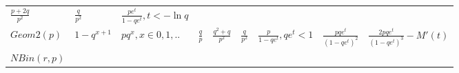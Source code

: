 \documentclass[]{tufte-book}
\begin{document}
\begin{longtable}[]{@{}lllllllll@{}}
\begin{minipage}[t]{0.08\columnwidth}
\(\frac{p+2q}{p^2}\)\strut
\end{minipage} & \begin{minipage}[t]{0.08\columnwidth}\raggedright
\(\frac{q}{p^2}\)\strut
\end{minipage} & \begin{minipage}[t]{0.08\columnwidth}\raggedright
\(\frac{pe^t}{1-qe^t},t<-\ln{q}\)\strut
\end{minipage} & \begin{minipage}[t]{0.08\columnwidth}\raggedright
\strut
\end{minipage} & \begin{minipage}[t]{0.08\columnwidth}\raggedright
\strut
\end{minipage}\tabularnewline
\begin{minipage}[t]{0.08\columnwidth}\raggedright
\(Geom2(p)\)\strut
\end{minipage} & \begin{minipage}[t]{0.08\columnwidth}\raggedright
\(1-q^{x+1}\)\strut
\end{minipage} & \begin{minipage}[t]{0.08\columnwidth}\raggedright
\(pq^x,x\in 0,1,..\)\strut
\end{minipage} & \begin{minipage}[t]{0.08\columnwidth}\raggedright
\(\frac{q}p\)\strut
\end{minipage} & \begin{minipage}[t]{0.08\columnwidth}\raggedright
\(\frac{q^2+q}{p^2}\)\strut
\end{minipage} & \begin{minipage}[t]{0.08\columnwidth}\raggedright
\(\frac{q}{p^2}\)\strut
\end{minipage} & \begin{minipage}[t]{0.08\columnwidth}\raggedright
\(\frac{p}{1-qe^t}, qe^t<1\)\strut
\end{minipage} & \begin{minipage}[t]{0.08\columnwidth}\raggedright
\(\frac{pqe^t}{(1-qe^t)^2}\)\strut
\end{minipage} & \begin{minipage}[t]{0.08\columnwidth}\raggedright
\(\frac{2pqe^t}{(1-qe^t)^3}-M'(t)\)\strut
\end{minipage}\tabularnewline
\begin{minipage}[t]{0.08\columnwidth}\raggedright
\(NBin(r,p)\)\strut
\end{minipage} & \begin{minipage}[t]{0.08\columnwidth}\raggedright

\end{minipage}
\end{longtable}
\end{document}

